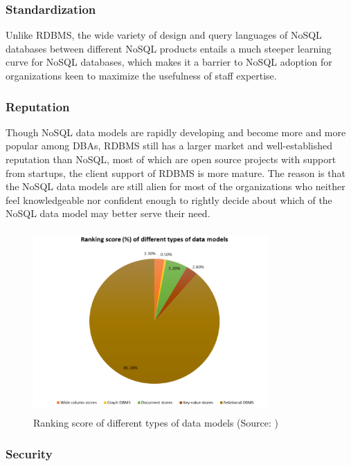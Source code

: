 \subsubsection{Standardization}\mbox{}

Unlike RDBMS, the wide variety of design and query languages of NoSQL databases between different NoSQL products entails a much steeper learning curve for NoSQL databases, which makes it a barrier to NoSQL adoption for organizations keen to maximize the usefulness of staff expertise\cite{limit}.


\subsubsection{Reputation}\mbox{}

Though NoSQL data
models are rapidly developing and become more and more popular among DBAs, RDBMS still has a larger market and well-established reputation than NoSQL, most of which are open source projects with support from startups, the client support of RDBMS is more mature. 
The reason
is that the NoSQL data models are still alien for most of the organizations who
neither feel knowledgeable nor confident enough to rightly decide about which of the NoSQL data model
may better serve their need\cite{DBLP:journals/corr/Sharma15b}.

\begin{figure}[H]
	\includegraphics[height=7cm, width=9cm]{../../images/rank.png}
	\caption{Ranking score of different types of data models (Source: \cite{DBLP:journals/corr/Sharma15b})}
\end{figure}


\subsubsection{Security}\mbox{}

